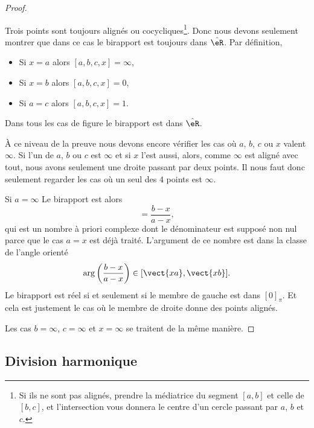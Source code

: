\begin{proof}
\begin{subproof}
		Trois points sont toujours alignés ou cocycliques\footnote{Si ils ne sont pas alignés, prendre la médiatrice du segment \( [a,b]\) et celle de \( [b,c]\), et l'intersection vous donnera le centre d'un cercle passant par \( a\), \( b\) et \( c\).}. Donc nous devons seulement montrer que dans ce cas le birapport est toujours dans \( \hat \eR\). Par définition,
		\begin{itemize}
			\item Si \( x=a\) alors \( [a,b,c,x]=\infty\),
			\item Si \( x=b\) alors \( [a,b,c,x]=0\),
			\item Si \( a=c\) alors \( [a,b,c,x]=1\).
		\end{itemize}
		Dans tous les cas de figure le birapport est dans \( \hat \eR\).

	\end{subproof}

	À ce niveau de la preuve nous devons encore vérifier les cas où \( a\), \( b\), \( c\) ou \( x\) valent \( \infty\). Si l'un de \( a\), \( b\) ou \( c\) est \( \infty\) et si \( x\) l'est aussi, alors, comme \( \infty\) est aligné avec tout, nous avons seulement une droite passant par deux points. Il nous faut donc seulement regarder les cas où un seul des \( 4\) points est \( \infty\).

	\begin{subproof}
		\item[Si \( a=\infty\)]
		Le birapport est alors
		\begin{equation}
			[\infty,b,c,x]=\frac{ b-x }{ a-x },
		\end{equation}
		qui est un nombre à priori complexe dont le dénominateur est supposé non nul parce que le cas \( a=x\) est déjà traité. L'argument de ce nombre est dans la classe de l'angle orienté
		\begin{equation}
			\arg\left( \frac{ b-x }{ a-x } \right)\in[\vect{ xa },\vect{ xb }].
		\end{equation}
		Le birapport est réel si et seulement si le membre de gauche est dans \( [0]_{\pi}\). Et cela est justement le cas où le membre de droite donne des points alignés.
	\end{subproof}
	Les cas \( b=\infty\), \( c=\infty\) et \( x=\infty\) se traitent de la même manière.
\end{proof}

\subsection{Division harmonique}

